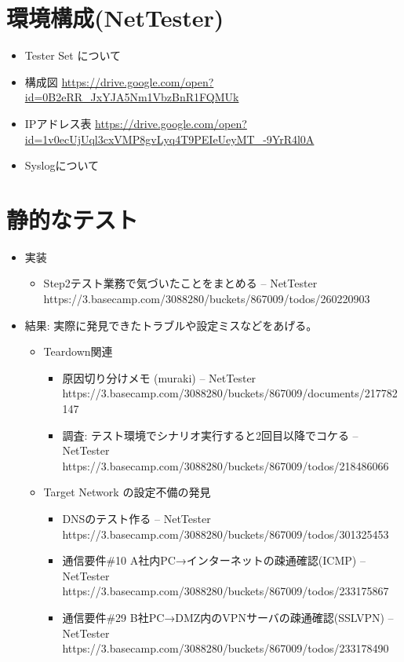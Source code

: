 \section{環境構成(NetTester)}

\begin{itemize}
 \item Tester Set について
 \item 構成図 \url{https://drive.google.com/open?id=0B2eRR_JxYJA5Nm1VbzBnR1FQMUk}
 \item IPアドレス表 \url{https://drive.google.com/open?id=1v0ecUjUql3cxVMP8gvLyq4T9PEIeUeyMT_-9YrR4l0A}
 \item Syslogについて
\end{itemize}

\section{静的なテスト}


\begin{itemize}
 \item 実装
       \begin{itemize}
        \item Step2テスト業務で気づいたことをまとめる – NetTester https://3.basecamp.com/3088280/buckets/867009/todos/260220903
       \end{itemize}
 \item 結果: 実際に発見できたトラブルや設定ミスなどをあげる。

       \begin{itemize}
        \item Teardown関連
              \begin{itemize}
               \item 原因切り分けメモ (muraki) – NetTester https://3.basecamp.com/3088280/buckets/867009/documents/217782147
               \item 調査: テスト環境でシナリオ実行すると2回目以降でコケる – NetTester https://3.basecamp.com/3088280/buckets/867009/todos/218486066
              \end{itemize}
        \item Target Network の設定不備の発見
              \begin{itemize}
               \item DNSのテスト作る – NetTester https://3.basecamp.com/3088280/buckets/867009/todos/301325453
               \item 通信要件\#10 A社内PC→インターネットの疎通確認(ICMP) – NetTester https://3.basecamp.com/3088280/buckets/867009/todos/233175867
               \item 通信要件\#29 B社PC→DMZ内のVPNサーバの疎通確認(SSLVPN) – NetTester https://3.basecamp.com/3088280/buckets/867009/todos/233178490
              \end{itemize}
       \end{itemize}
\end{itemize}

